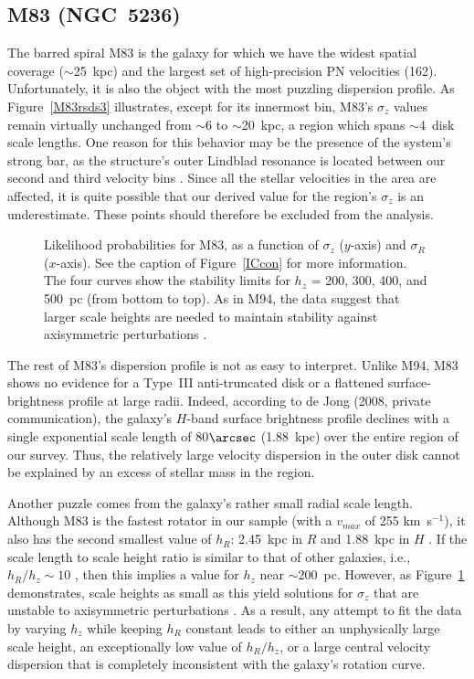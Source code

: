 \documentclass[12pt,preprint]{emulateapj}
\newcommand{\ie}{{i.e.,}}
\newcommand{\kms}{km~s$^{-1}$}
\begin{document}
\subsection{M83 (NGC~5236)}
The barred spiral M83 is the galaxy for which we have the widest spatial coverage ($\sim$25~kpc) and the largest set of high-precision PN velocities (162).  Unfortunately, it is also the object with the most puzzling dispersion profile.  As Figure~\ref{M83rsds3} illustrates, except for its innermost bin, M83's $\sigma_z$ values remain virtually unchanged from $\sim$6 to $\sim$20~kpc, a region which spans $\sim$4~disk scale lengths.  One reason for this behavior may be the presence of the system's strong bar, as the structure's outer Lindblad resonance is located between our second and third velocity bins \citep[at $290\arcsec$ or $\sim$6.83~kpc;][]{L+04}.  Since all the stellar velocities in the area are affected, it is quite possible that our derived value for the region's $\sigma_z$ is an underestimate.  These points should therefore be excluded from the analysis.

\begin{figure}
\caption{\scriptsize Likelihood probabilities for M83, as a function of $\sigma_z$ ($y$-axis) and $\sigma_R$ ($x$-axis).  See the caption of Figure~\ref{ICcon} for more information.  The four curves show the stability limits for $h_z$ = 200, 300, 400, and 500~pc (from bottom to top).  As in M94, the data suggest that larger scale heights are needed to maintain stability against axisymmetric perturbations \citep{t64}. \label{M83con} }
\end{figure}

The rest of M83's dispersion profile is not as easy to interpret.  Unlike M94, M83 shows no evidence for a Type~III anti-truncated disk or a flattened surface-brightness profile at large radii.  Indeed, according to de Jong (2008, private communication), the galaxy's $H$-band surface brightness profile declines with a single exponential scale length of 80$\arcsec$ (1.88~kpc) over the entire region of our survey.   Thus, the relatively large velocity dispersion in the outer disk cannot be explained by an excess of stellar mass in the region.

Another puzzle comes from the galaxy's rather small radial scale length.  Although M83 is the fastest rotator in our sample (with a $v_{max}$ of 255 \kms), it also has the second smallest value of $h_R$: 2.45~kpc in $R$ and 1.88~kpc in $H$ \citep[][de Jong 2008, private communication]{k+00}.  If the scale length to scale height ratio is similar to that of other galaxies, \ie\ $h_R / h_z \sim 10$ \citep{bm02, dG98, kvd02}, then this implies a value for $h_z$ near $\sim$200~pc.  However, as Figure~\ref{M83con} demonstrates, scale heights as small as this yield solutions for $\sigma_z$ that are unstable to axisymmetric perturbations \citep{t64}.  As a result, any attempt to fit the data by varying $h_z$ while keeping $h_R$ constant leads to either an unphysically large scale height, an exceptionally low value of $h_R/h_z$, or a large central velocity dispersion that is completely inconsistent with the galaxy's rotation curve.
\end{document}
